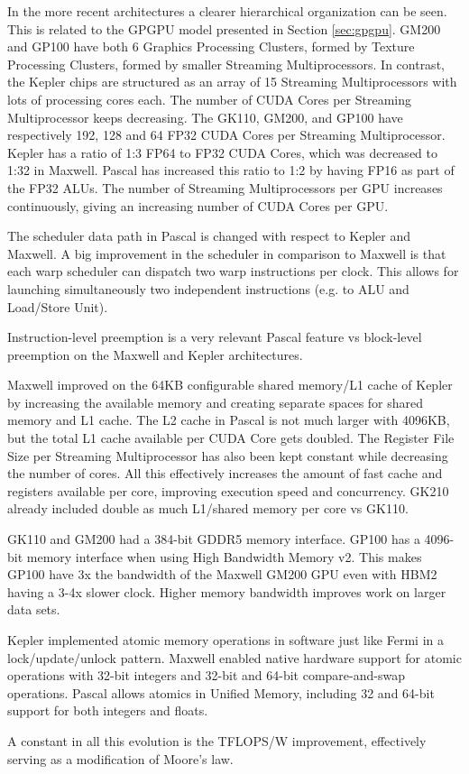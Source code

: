 In the more recent architectures a clearer hierarchical organization can be seen.
This is related to the GPGPU model presented in Section \ref{sec:gpgpu}.
GM200 and GP100 have both 6 Graphics Processing Clusters, formed by Texture Processing Clusters, formed by smaller Streaming Multiprocessors.
In contrast, the Kepler chips are structured as an array of 15 Streaming Multiprocessors with lots of processing cores each.
The number of CUDA Cores per Streaming Multiprocessor keeps decreasing.
The GK110, GM200, and GP100 have respectively 192, 128 and 64 FP32 CUDA Cores per Streaming Multiprocessor.
Kepler has a ratio of 1:3 FP64 to FP32 CUDA Cores, which was decreased to 1:32 in Maxwell.
Pascal has increased this ratio to 1:2 by having FP16 as part of the FP32 ALUs.
The number of Streaming Multiprocessors per GPU increases continuously, giving an increasing number of CUDA Cores per GPU.

The scheduler data path in Pascal is changed with respect to Kepler and Maxwell.
A big improvement in the scheduler in comparison to Maxwell is that each warp scheduler can dispatch two warp instructions per clock.
This allows for launching simultaneously two independent instructions (e.g. to ALU and Load/Store Unit).

Instruction-level preemption is a very relevant Pascal feature vs block-level preemption on the Maxwell and Kepler architectures.

Maxwell improved on the 64KB configurable shared memory/L1 cache of Kepler by increasing the available memory and creating separate spaces for shared memory and L1 cache.
The L2 cache in Pascal is not much larger with 4096KB, but the total L1 cache available per CUDA Core gets doubled.
The Register File Size per Streaming Multiprocessor has also been kept constant while decreasing the number of cores.
All this effectively increases the amount of fast cache and registers available per core, improving execution speed and concurrency.
GK210 already included double as much L1/shared memory per core vs GK110.

GK110 and GM200 had a 384-bit GDDR5 memory interface.
GP100 has a 4096-bit memory interface when using High Bandwidth Memory v2.
This makes GP100 have 3x the bandwidth of the Maxwell GM200 GPU even with HBM2 having a 3-4x slower clock.
Higher memory bandwidth improves work on larger data sets.

Kepler implemented atomic memory operations in software just like Fermi in a lock/update/unlock pattern.
Maxwell enabled native hardware support for atomic operations with 32-bit integers and 32-bit and 64-bit compare-and-swap operations.
Pascal allows atomics in Unified Memory, including 32 and 64-bit support for both integers and floats.

A constant in all this evolution is the TFLOPS/W improvement, effectively serving as a modification of Moore's law.
